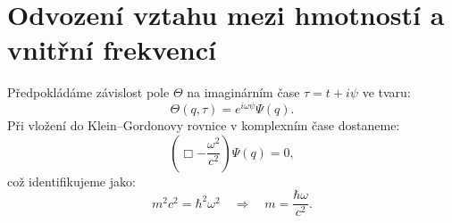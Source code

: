\documentclass{article}
\begin{document}
\section*{Odvození vztahu mezi hmotností a vnitřní frekvencí}

Předpokládáme závislost pole \(\Theta\) na imaginárním čase \(\tau = t + i\psi\) ve tvaru:
\[
\Theta(q, \tau) = e^{i\omega \psi} \Psi(q).
\]
Při vložení do Klein–Gordonovy rovnice v komplexním čase dostaneme:
\[
\left( \Box - \frac{\omega^2}{c^2} \right) \Psi(q) = 0,
\]
což identifikujeme jako:
\[
m^2 c^2 = \hbar^2 \omega^2 \quad \Rightarrow \quad m = \frac{\hbar \omega}{c^2}.
\]
\end{document}
